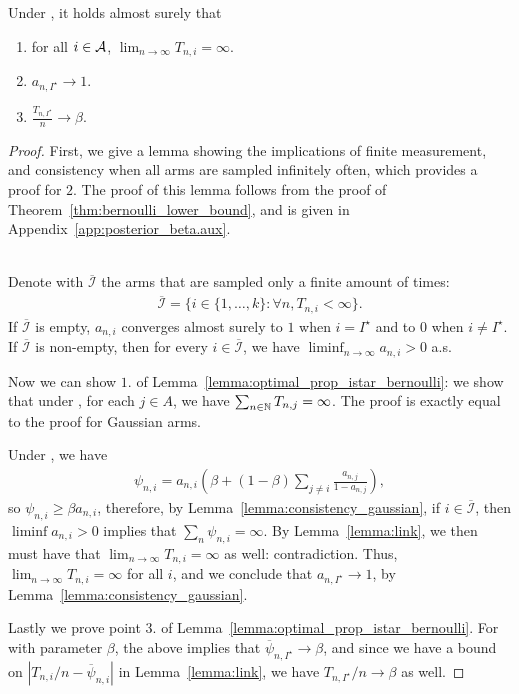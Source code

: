 \begin{lemma}\label{lemma:optimal_prop_istar_bernoulli}
	Under \TTTS, it holds almost surely that
	\begin{enumerate}
		\item for all $i \in \mathcal{A}$, $\lim_{n\rightarrow \infty} T_{n,i} = \infty.$
		\item $a_{n,I^\star} \rightarrow 1.$
		\item $\frac{T_{n,I^\star}}{n} \rightarrow \beta$.
	\end{enumerate}
\end{lemma}

\begin{proof}
First, we give a lemma showing the implications of finite measurement, and consistency when all arms are sampled infinitely often, which provides a proof for $2.$ The proof of this lemma follows from the proof of Theorem~\ref{thm:bernoulli_lower_bound}, and is given in Appendix~\ref{app:posterior_beta.aux}. 

\begin{lemma}\label{lemma:consistency_bernoulli}\ \\
	Denote with $\overline{\mathcal{I}}$ the arms that are sampled only a finite amount of times:
	\begin{align*}
	\overline{\mathcal{I}} = \{ i \in \{ 1, \ldots, k \} : \forall n, T_{n,i} < \infty \}.
	\end{align*}
	If $\overline{\mathcal{I}}$ is empty, $a_{n,i}$ converges almost surely to $1$ when $i = I^\star$ and to $0$ when $i \neq I^\star$. If $\overline{\mathcal{I}}$ is non-empty, then for every $i \in \overline{\mathcal{I}}$, we have $\liminf_{n \rightarrow \infty} a_{n,i} > 0$ a.s.
\end{lemma}

Now we can show $1.$ of Lemma~\ref{lemma:optimal_prop_istar_bernoulli}: we show that under \TTTS, for each $j \in A$, we have $\sum_{n \in {\mathbb N}} T_{n,j} = \infty$. The proof is exactly equal to the proof for Gaussian arms. 

Under \TTTS, we have
\begin{align*}
\psi_{n,i} = a_{n,i} \left( \beta + (1-\beta) \sum_{j \neq i} \frac{a_{n,j}}{1- a_{n,j}} \right),
\end{align*}
so $ \psi_{n,i}  \geq \beta a_{n,i}$, therefore, by Lemma~\ref{lemma:consistency_gaussian}, if $i \in \overline{\mathcal{I}}$, then $\liminf a_{n,i} > 0$ implies that $\sum_n \psi_{n,i} = \infty$. By Lemma~\ref{lemma:link}, we then must have that $\lim_{n \rightarrow \infty} T_{n,i} = \infty$ as well: contradiction.  Thus, $\lim_{n \rightarrow \infty} T_{n,i} = \infty$ for all $i$, and we conclude that $a_{n,I^\star} \rightarrow 1$, by Lemma~\ref{lemma:consistency_gaussian}. 

Lastly we prove point $3.$ of Lemma~\ref{lemma:optimal_prop_istar_bernoulli}. For \TTTS with parameter $\beta$, the above implies that $\overline{\psi}_{n, I^\star} \rightarrow \beta$, and since we have a bound on $| T_{n,i} / n - \overline{\psi}_{n, i} |$ in Lemma~\ref{lemma:link}, we have $T_{n, I^\star} / n \rightarrow \beta$ as well.

\end{proof}


